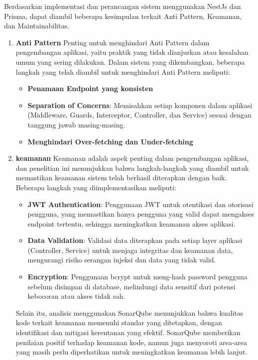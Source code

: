 Berdasarkan implementasi dan perancangan sistem menggunakan NestJs dan Prisma, dapat diambil beberapa kesimpulan terkait Anti Pattern, Keamanan, dan Maintainabilitas.
\begin{enumerate}
  \item \textbf{Anti Pattern}\newline
  Penting untuk menghindari Anti Pattern dalam pengembangan aplikasi, yaitu praktik yang tidak dianjurkan atau kesalahan umum yang sering dilakukan. Dalam sistem yang dikembangkan, beberapa langkah yang telah diambil untuk menghindari Anti Pattern meliputi:
  \begin{itemize}
    \item \textbf{Penamaan Endpoint yang konsisten}
    \item \textbf{Separation of Concerns}: Memisahkan setiap komponen dalam aplikasi (Middleware, Guards, Interceptor, Controller, dan Service) sesuai dengan tanggung jawab masing-masing.
    \item \textbf{Menghindari Over-fetching dan Under-fetching}
  \end{itemize}
  \item \textbf{keamanan}\newline
  Keamanan adalah aspek penting dalam pengembangan aplikasi, dan penelitian ini menunjukkan bahwa langkah-langkah yang diambil untuk memastikan keamanan sistem telah berhasil diterapkan dengan baik. Beberapa langkah yang diimplementasikan meliputi:

  \begin{itemize}
    \item \textbf{JWT Authentication}: Penggunaan JWT untuk otentikasi dan otorisasi pengguna, yang memastikan hanya pengguna yang valid dapat mengakses endpoint tertentu, sehingga meningkatkan keamanan akses aplikasi.
    \item \textbf{Data Validation}: Validasi data diterapkan pada setiap layer aplikasi (Controller, Service) untuk menjaga integritas dan keamanan data, mengurangi risiko serangan injeksi dan data yang tidak valid.
    \item \textbf{Encryption}: Penggunaan bcrypt untuk meng-hash password pengguna sebelum disimpan di database, melindungi data sensitif dari potensi kebocoran atau akses tidak sah.
  \end{itemize}
  Selain itu, analisis menggunakan SonarQube menunjukkan bahwa kualitas kode terkait keamanan memenuhi standar yang ditetapkan, dengan identifikasi dan mitigasi kerentanan yang efektif. SonarQube memberikan penilaian positif terhadap keamanan kode, namun juga menyoroti area-area yang masih perlu diperhatikan untuk meningkatkan keamanan lebih lanjut.


\end{enumerate}
